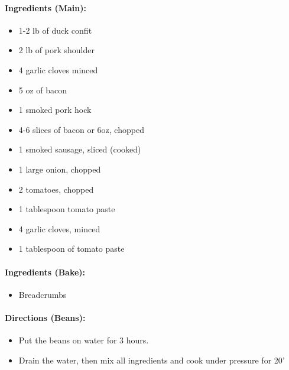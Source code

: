 \documentclass{article}
\begin{document}
\paragraph{Ingredients (Main):}
\begin{itemize}
    \item 1-2 lb of duck confit
    \item 2 lb of pork shoulder
    \item 4 garlic cloves minced
    \item 5 oz of bacon
    \item 1 smoked pork hock
    \item 4-6 slices of bacon or 6oz, chopped
    \item 1 smoked sausage, sliced (cooked)
    \item 1 large onion, chopped
    \item 2 tomatoes, chopped
    \item 1 tablespoon tomato paste
    \item 4 garlic cloves, minced
    \item 1 tablespoon of tomato paste
\end{itemize}  

\paragraph{Ingredients (Bake):}
\begin{itemize}
    \item Breadcrumbs
\end{itemize}  

\paragraph{Directions (Beans):}
\begin{itemize}
    \item Put the beans on water for 3 hours.
    \item Drain the water, then mix all ingredients and cook under pressure for 20'
\end{itemize}  
\end{document}
